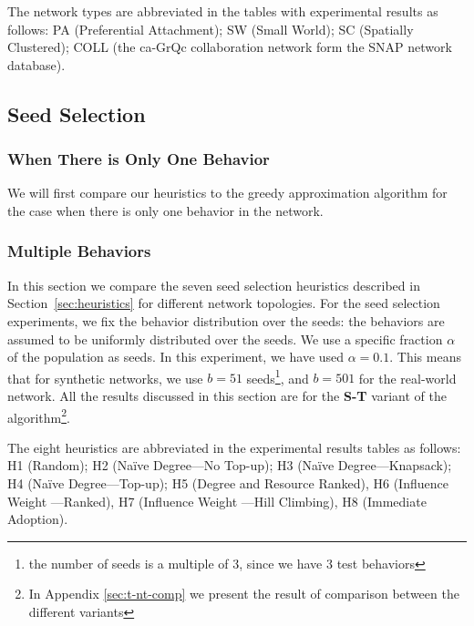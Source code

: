 \documentclass[letterpaper]{article}
\theoremstyle{plain} 		\newtheorem{thm}{Theorem}[section]
\theoremstyle{definition} 	\newtheorem{defn}[thm]{Definition}
\theoremstyle{remark}		\newtheorem{rem}{Remark}
\begin{document}
The network types are abbreviated in the tables with experimental results as follows: PA (Preferential Attachment);  SW (Small World); SC (Spatially Clustered); COLL (the ca-GrQc collaboration network form the SNAP network database).
 
\subsection{Seed Selection}
\subsubsection{When There is Only One Behavior}
We will first compare our heuristics to the greedy approximation algorithm for the case when there is only one behavior in the network.


\subsubsection{Multiple Behaviors}
In this section we compare the seven seed selection heuristics described in Section~\ref{sec:heuristics} for different network topologies.  For the seed selection experiments, we fix the behavior distribution over the seeds: the behaviors are assumed to be uniformly distributed over the seeds. We use a specific fraction $\alpha$ of the population as seeds. In this experiment, we have used $\alpha=0.1$. This means that for synthetic networks, we use $b=51$ seeds\footnote{the number of seeds is a multiple of 3, since we have 3 test behaviors}, and $b=501$ for the real-world network. All the results discussed in this section are for the \textbf{S-T} variant of the algorithm\footnote{In Appendix \ref{sec:t-nt-comp} we present the result of comparison between the different variants}.

The eight heuristics are abbreviated in the experimental results tables as follows: H1 (Random); H2 (Na\"ive Degree---No Top-up); H3 (Na\"ive Degree---Knapsack); H4 (Na\"ive Degree---Top-up); H5 (Degree and Resource Ranked), H6 (Influence Weight ---Ranked), H7 (Influence Weight ---Hill Climbing), H8 (Immediate Adoption).
\end{document}
